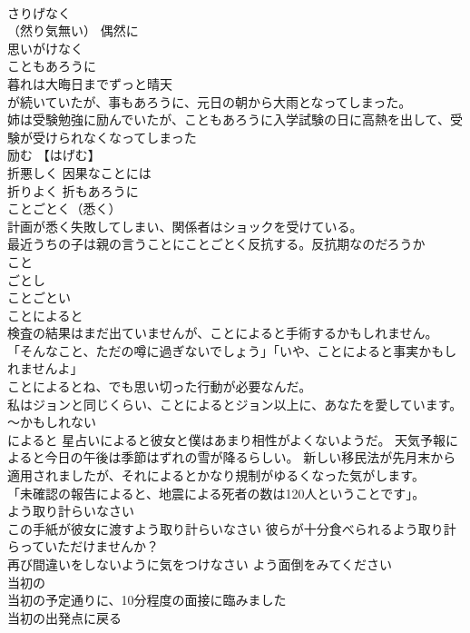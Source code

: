 \documentclass[8pt]{extreport}
\begin{document}
\begin{CJK}{UTF8}{min}
\\	さりげなく 
\\	（然り気無い） 偶然に 
\\	思いがけなく 
\\	こともあろうに	
\\	暮れは大晦日までずっと晴天
\\	が続いていたが、事もあろうに、元日の朝から大雨となってしまった。 
\\	姉は受験勉強に励んでいたが、こともあろうに入学試験の日に高熱を出して、受験が受けられなくなってしまった 
\\	励む 【はげむ】
\\	折悪しく 因果なことには 
\\	折りよく 折もあろうに 
\\	ことごとく（悉く）	
\\	計画が悉く失敗してしまい、関係者はショックを受けている。 
\\	最近うちの子は親の言うことにことごとく反抗する。反抗期なのだろうか 
\\	こと
\\	ごとし 
\\	ことごとい 
\\	ことによると	
\\	検査の結果はまだ出ていませんが、ことによると手術するかもしれません。
\\	「そんなこと、ただの噂に過ぎないでしょう」「いや、ことによると事実かもしれませんよ」 
\\	ことによるとね、でも思い切った行動が必要なんだ。 
\\	私はジョンと同じくらい、ことによるとジョン以上に、あなたを愛しています。 
\\	～かもしれない	
\\	によると 星占いによると彼女と僕はあまり相性がよくないようだ。 天気予報によると今日の午後は季節はずれの雪が降るらしい。 新しい移民法が先月末から適用されましたが、それによるとかなり規制がゆるくなった気がします。
\\	「未確認の報告によると、地震による死者の数は120人ということです」。
\\	よう取り計らいなさい	
\\	この手紙が彼女に渡すよう取り計らいなさい 彼らが十分食べられるよう取り計らっていただけませんか？	
\\	再び間違いをしないように気をつけなさい よう面倒をみてください
\\	当初の
\\	当初の予定通りに、10分程度の面接に臨みました　
\\	当初の出発点に戻る　

\end{CJK}
\end{document}
